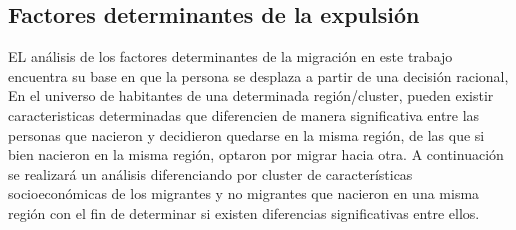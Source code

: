 \documentclass[12pt,a4paper]{article}
\begin{document}
\subsection{Factores determinantes de la expulsión}
EL análisis de los factores determinantes de la migración en este trabajo encuentra su base en que la persona se desplaza a partir de una decisión racional,
En el universo de habitantes de una determinada región/cluster, pueden existir caracteristicas determinadas que diferencien de manera significativa entre las personas que nacieron  y decidieron quedarse en la misma región, de las que si bien nacieron en la misma región, optaron por migrar hacia otra. A continuación se realizará un análisis diferenciando por cluster  de características socioeconómicas de los migrantes y no migrantes  que nacieron en una misma región con el fin de determinar si existen diferencias significativas entre ellos. 
\newpage
\end{document}
